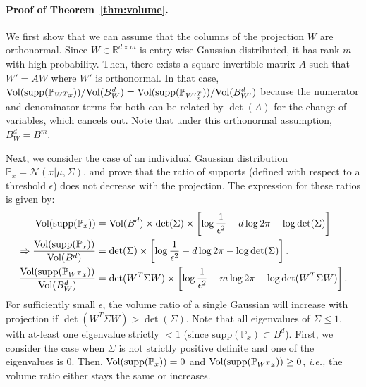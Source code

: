 \documentclass{article}
\newcommand{\supp}{\mbox{supp}}
\newcommand{\R}{\mathbb{R}}
\newcommand{\px}{\mathbb{P}_{x}}
\newcommand{\pwx}{\mathbb{P}_{W^Tx}}
\begin{document}
\paragraph{Proof of Theorem~\ref{thm:volume}.} We first show that we can assume that the columns of the projection $W$ are orthonormal. Since $W\in\R^{d\times m}$ is entry-wise Gaussian distributed, it has rank $m$ with high probability. Then, there exists a square invertible matrix $A$ such that $W'=AW$ where $W'$ is orthonormal. In that case, $\vol(\supp(\pwx))/\vol(B^d_W) = \vol(\supp(\mathbb{P}_{{W'}^T_x}))/\vol(B^d_{W'})$ because the numerator and denominator terms for both can be related by $\det(A)$ for the change of variables, which cancels out. Note that under this orthonormal assumption, $B^d_W=B^m$.

Next, we consider the case of an individual Gaussian distribution $\px = \mathcal{N}(x|\mu,\Sigma)$, and prove that the ratio of supports (defined with respect to a threshold $\epsilon$) does not decrease with the projection. The expression for these ratios is given by:
\begin{align}
  \vol(\supp(\px)) &= \vol(B^d) \times \det(\Sigma) \times \left[\log \frac{1}{\epsilon^2} - d\log 2\pi - \log \det(\Sigma) \right]\notag\\
  \Rightarrow \frac{\vol(\supp(\px))}{\vol(B^d)} &= \det(\Sigma) \times \left[\log \frac{1}{\epsilon^2} - d\log 2\pi - \log \det(\Sigma) \right].\\
  \frac{\vol(\supp(\pwx))}{\vol(B^d_W)} &= \det(W^T\Sigma W) \times \left[\log \frac{1}{\epsilon^2} - m\log 2\pi - \log \det(W^T\Sigma W) \right].
\end{align}
For sufficiently small $\epsilon$, the volume ratio of a single Gaussian will increase with projection if $\det(W^T\Sigma W) > \det(\Sigma)$. Note that all eigenvalues of $\Sigma \leq 1$, with at-least one eigenvalue strictly $< 1$ (since $\supp(\px) \subset B^d$). First, we consider the case when $\Sigma$ is not strictly positive definite and one of the eigenvalues is $0$. Then, $\vol(\supp(\px))=0$ and $\vol(\supp(\pwx)) \geq 0$, \emph{i.e.,} the volume ratio either stays the same or increases.
\end{document}
